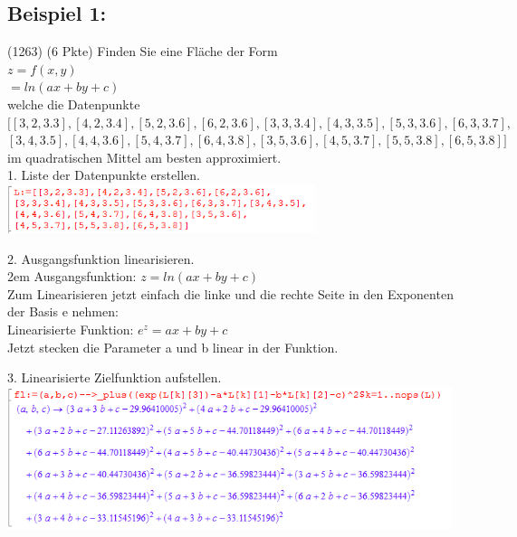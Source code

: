 \documentclass[11pt,final]{scrreprt}
\begin{document}
\subsection{Beispiel 1:}

(1263) (6 Pkte) Finden Sie eine Fläche der Form\\
$z = f(x, y)$\\
$= ln(ax + by + c)$\\
welche die Datenpunkte\\
$[[3, 2, 3.3], [4, 2, 3.4], [5, 2, 3.6], [6, 2, 3.6], [3, 3, 3.4], [4, 3, 3.5], [5, 3, 3.6], [6, 3, 3.7],$\\
$ [3, 4, 3.5], [4, 4, 3.6], [5, 4, 3.7], [6, 4, 3.8], [3, 5, 3.6], [4, 5, 3.7], [5, 5, 3.8], [6, 5, 3.8]]$\\
im quadratischen Mittel am besten approximiert.\\

1. Liste der Datenpunkte erstellen.\\

\includegraphics[width=9cm]{images/gaussausgleich/1.png}

2. Ausgangsfunktion linearisieren.\\

\begingroup
\leftskip2em 
Ausgangsfunktion: $z = ln(ax + by + c)$\\
Zum Linearisieren jetzt einfach die linke und die rechte Seite in den Exponenten der Basis e nehmen: \\
Linearisierte Funktion: $e^z = ax + by + c$\\
Jetzt stecken die Parameter a und b linear in der Funktion.\\
\par	
\endgroup

3. Linearisierte Zielfunktion aufstellen.\\

\includegraphics[width=13cm]{images/gaussausgleich/3.png}
\end{document}
